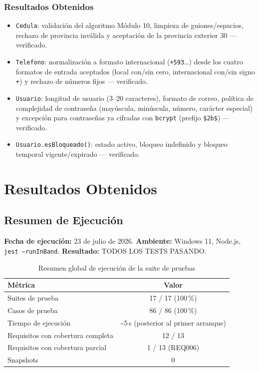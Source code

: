 \documentclass[12pt,a4paper]{article}
\begin{document}
\subsubsection*{Resultados Obtenidos}
\begin{itemize}[nosep]
    \item \texttt{Cedula}: validación del algoritmo Módulo 10, limpieza de guiones/espacios,
    rechazo de provincia inválida y aceptación de la provincia exterior 30 — verificado.
    \item \texttt{Telefono}: normalización a formato internacional
    (\texttt{+593}\ldots) desde los cuatro formatos de entrada aceptados (local con/sin
    cero, internacional con/sin signo \texttt{+}) y rechazo de números fijos — verificado.
    \item \texttt{Usuario}: longitud de usuario (3–20 caracteres), formato de correo,
    política de complejidad de contraseña (mayúscula, minúscula, número, carácter especial)
    y excepción para contraseñas ya cifradas con \texttt{bcrypt} (prefijo
    \texttt{\$2b\$}) — verificado.
    \item \texttt{Usuario.esBloqueado()}: estado activo, bloqueo indefinido y bloqueo
    temporal vigente/expirado — verificado.
\end{itemize}

\clearpage

\section{Resultados Obtenidos}

\subsection{Resumen de Ejecución}

\textbf{Fecha de ejecución:} 23 de julio de 2026.\quad
\textbf{Ambiente:} Windows 11, Node.js, \texttt{jest --runInBand}.\quad
\textbf{Resultado:} TODOS LOS TESTS PASANDO.

\begin{table}[H]
\centering
\caption{Resumen global de ejecución de la suite de pruebas}
\label{tab:resumen-ejecucion}
\begin{tabular}{lc}
\toprule
\textbf{Métrica} & \textbf{Valor} \\
\midrule
Suites de prueba & 17 / 17 (100\,\%) \\
Casos de prueba & 86 / 86 (100\,\%) \\
Tiempo de ejecución & \textasciitilde 5\,s (posterior al primer arranque) \\
Requisitos con cobertura completa & 12 / 13 \\
Requisitos con cobertura parcial & 1 / 13 (REQ006) \\
Snapshots & 0 \\
\bottomrule
\end{tabular}
\end{table}
\end{document}
